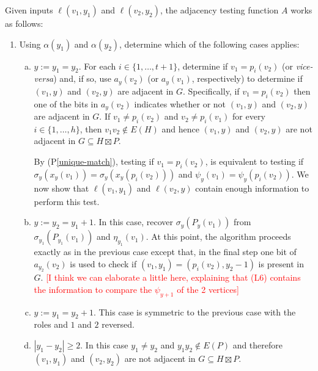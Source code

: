 \documentclass{patmorin}
\newcommand{\pref}[1]{(P\ref{#1})}
\begin{document}
Given inputs $\ell(v_1,y_1)$ and $\ell(v_2,y_2)$, the adjacency testing function $A$ works as follows:
\begin{enumerate}
    \item Using $\alpha(y_1)$ and $\alpha(y_2)$, determine which of the following cases applies:
    \begin{enumerate}[(a)]
        \item $y:=y_1=y_2$.  For each $i\in\{1,\ldots,t+1\}$, determine if $v_1=p_i(v_2)$ (or \textit{vice-versa}) and, if so, use $a_y(v_2)$ (or $a_y(v_1)$, respectively) to determine if $(v_1,y)$ and $(v_2,y)$ are adjacent in $G$. Specifically, if $v_1=p_i(v_2)$ then one of the bits in $a_y(v_2)$ indicates whether or not $(v_1,y)$ and $(v_2,y)$ are adjacent in $G$. If $v_1\neq p_i(v_2)$ and $v_2\neq p_i(v_1)$ for every $i\in\{1,\ldots,h\}$, then $v_1v_2\not\in E(H)$ and hence $(v_1,y)$ and $(v_2,y)$ are not adjacent in $G\subseteq H\boxtimes P$.

        By \pref{unique-match}, testing if $v_1=p_i(v_2)$, is equivalent to testing if $\sigma_y(x_y(v_1))=\sigma_y(x_y(p_i(v_2)))$ and $\psi_y(v_1)=\psi_y(p_i(v_2))$. We now show that $\ell(v_1,y_1)$ and $\ell(v_2,y)$ contain enough information to perform this test.
        \item $y:=y_2=y_1+1$.  In this case, recover $\sigma_y(P_y(v_1))$ from $\sigma_{y_1}(P_{y_1}(v_1))$ and $\eta_{y_1}(v_1)$.  At this point, the algorithm proceeds exactly as in the previous case except that, in the final step one bit of $a_{y_2}(v_2)$ is used to check if $(v_1,y_1)=(p_i(v_2),y_2-1)$ is present in $G$. \textcolor{red}{[I think we can elaborate a little here, explaining that (L6) contains the information to compare the $\psi_{y+1}$ of the 2 vertices]}

        \item $y:=y_1=y_{2}+1$. This case is symmetric to the previous case with the roles and $1$ and $2$ reversed.

        \item $|y_1-y_2|\ge 2$.  In this case $y_1\neq y_2$ and $y_1y_2\not\in E(P)$ and therefore $(v_1,y_1)$ and $(v_2,y_2)$ are not adjacent in $G\subseteq H\boxtimes P$.
    \end{enumerate}
\end{enumerate}
\end{document}
